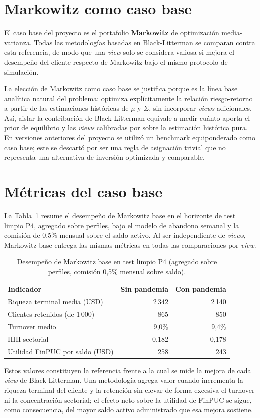 \section{Markowitz como caso base}

El caso base del proyecto es el portafolio \textbf{Markowitz} de optimizaci\'on
media-varianza. Todas las metodolog\'ias basadas en Black-Litterman se comparan
contra esta referencia, de modo que una \textit{view} solo se considera valiosa
si mejora el desempe\~no del cliente respecto de Markowitz bajo el mismo
protocolo de simulaci\'on.

La elecci\'on de Markowitz como caso base se justifica porque es la l\'inea base
anal\'itica natural del problema: optimiza expl\'icitamente la relaci\'on
riesgo-retorno a partir de las estimaciones hist\'oricas de $\mu$ y $\Sigma$,
sin incorporar \textit{views} adicionales. As\'i, aislar la contribuci\'on de
Black-Litterman equivale a medir cu\'anto aporta el prior de equilibrio y las
\textit{views} calibradas por sobre la estimaci\'on hist\'orica pura. En
versiones anteriores del proyecto se utiliz\'o un benchmark equiponderado como
caso base; este se descart\'o por ser una regla de asignaci\'on trivial que no
representa una alternativa de inversi\'on optimizada y comparable.

\section{M\'etricas del caso base}

La Tabla~\ref{tab:markowitz_base_kpis} resume el desempe\~no de Markowitz base
en el horizonte de test limpio P4, agregado sobre perfiles, bajo el modelo de
abandono semanal y la comisi\'on de 0,5\% mensual sobre el saldo activo. Al ser
independiente de \textit{views}, Markowitz base entrega las mismas m\'etricas en
todas las comparaciones por \textit{view}.

\begin{table}[h]
\centering
\caption{Desempe\~no de Markowitz base en test limpio P4 (agregado sobre
perfiles, comisi\'on 0,5\% mensual sobre saldo).}
\label{tab:markowitz_base_kpis}
\small
\begin{tabular}{@{}lrr@{}}
\toprule
Indicador & Sin pandemia & Con pandemia \\
\midrule
Riqueza terminal media (USD) & 2\,342 & 2\,140 \\
Clientes retenidos (de 1\,000) & 865 & 850 \\
Turnover medio & 9,0\% & 9,4\% \\
HHI sectorial & 0,182 & 0,178 \\
Utilidad FinPUC por saldo (USD) & 258 & 243 \\
\bottomrule
\end{tabular}
\end{table}

Estos valores constituyen la referencia frente a la cual se mide la mejora de
cada \textit{view} de Black-Litterman. Una metodolog\'ia agrega valor cuando
incrementa la riqueza terminal del cliente y la retenci\'on sin elevar de forma
excesiva el turnover ni la concentraci\'on sectorial; el efecto neto sobre la
utilidad de FinPUC se sigue, como consecuencia, del mayor saldo activo
administrado que esa mejora sostiene.

